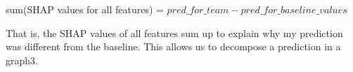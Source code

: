 \documentclass[12pt]{report}
\begin{document}
sum(SHAP values for all features) = $pred\_for\_team - pred\_for\_baseline\_values$

That is, the SHAP values of all features sum up to explain why my prediction was different from the baseline. This allows us to decompose a prediction in a graph3.



%


\end{document}
